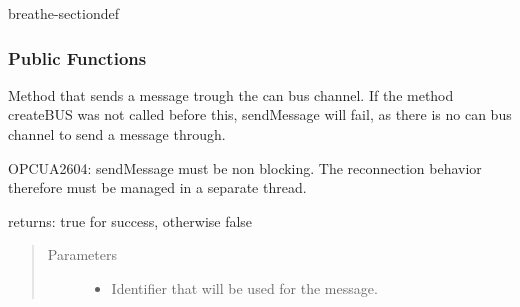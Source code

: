 \documentclass[a4paper,10pt,english]{sphinxmanual}
\begin{document}
\begin{fulllineitems}
\label{\detokenize{classestracing:_CPPv412CSockCanScan}}%
\pysigstartmultiline
{}%
\pysigstopmultiline
\begin{sphinxuseclass}{breathe-sectiondef}\subsubsection*{Public Functions}

\begin{fulllineitems}
\label{\detokenize{classestracing:_CPPv4N12CSockCanScan11sendMessageEshPhb}}%
\pysigstartmultiline
{}%
\pysigstopmultiline
\sphinxAtStartPar
Method that sends a message trough the can bus channel. If the method createBUS was not called before this, sendMessage will fail, as there is no can bus channel to send a message through.

\sphinxAtStartPar

OPCUA\sphinxhyphen{}2604: sendMessage must be non blocking. The reconnection behavior therefore must be managed in a separate thread.

\sphinxAtStartPar
returns: true for success, otherwise false 
\begin{quote}\begin{description}
\item[{Parameters}] \leavevmode\begin{itemize}
\item {} 
\sphinxAtStartPar
{} \textendash{} Identifier that will be used for the message. 


\end{itemize}
\end{description}
\end{quote}
\end{fulllineitems}
\end{sphinxuseclass}
\end{fulllineitems}
\end{document}
